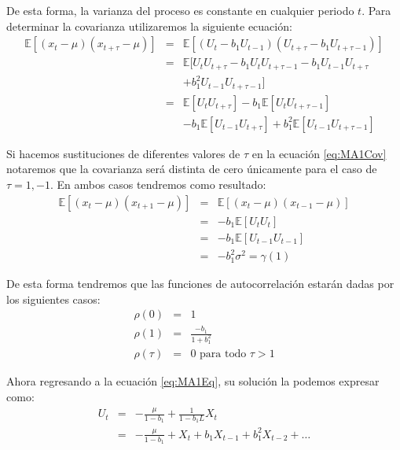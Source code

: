 \documentclass[
]{book}
\begin{document}
De esta forma, la varianza del proceso es constante en cualquier periodo \(t\). Para determinar la covarianza utilizaremos la siguiente ecuación:
\begin{eqnarray}
    \mathbb{E}[(x_t - \mu)(x_{t + \tau} - \mu)] & = & \mathbb{E}[(U_t - b_1 U_{t-1})(U_{t + \tau} - b_1 U_{t + \tau - 1})] \nonumber \\
    & = & \mathbb{E}[U_t U_{t + \tau} - b_1 U_t U_{t + \tau - 1} - b_1 U_{t - 1} U_{t + \tau} \nonumber \\
    &   & + b_1^2 U_{t - 1} U_{t + \tau - 1}] \nonumber \\
    & = & \mathbb{E}[U_t U_{t + \tau}] - b_1 \mathbb{E}[U_t U_{t + \tau - 1}] \nonumber \\
    &   & - b_1 \mathbb{E}[U_{t - 1} U_{t + \tau}] + b_1^2 \mathbb{E}[U_{t - 1} U_{t + \tau - 1}]
    \label{eq:MA1Cov}
\end{eqnarray}

Si hacemos sustituciones de diferentes valores de \(\tau\) en la ecuación \eqref{eq:MA1Cov} notaremos que la covarianza será distinta de cero únicamente para el caso de \(\tau = 1, -1\). En ambos casos tendremos como resultado:
\begin{eqnarray}
    \mathbb{E}[(x_t - \mu)(x_{t + 1} - \mu)] & = & \mathbb{E}[(x_t - \mu)(x_{t - 1} - \mu)] \nonumber \\
    & = & - b_1 \mathbb{E}[U_t U_{t}] \nonumber \\
    & = & - b_1 \mathbb{E}[U_{t - 1} U_{t - 1}] \nonumber \\ 
    & = & - b_1^2 \sigma^2 = \gamma(1)
\end{eqnarray}

De esta forma tendremos que las funciones de autocorrelación estarán dadas por los siguientes casos:
\begin{eqnarray}
    \rho(0) & = & 1 \nonumber \\
    \rho(1) & = & \frac{- b_1}{1 + b_1^2} \nonumber \\
    \rho(\tau) & = & 0 \text{ para todo } \tau > 1 \nonumber 
\end{eqnarray}

Ahora regresando a la ecuación \eqref{eq:MA1Eq}, su solución la podemos expresar como:
\begin{eqnarray}
    U_ t & = & - \frac{\mu}{1 - b_1} + \frac{1}{1 - b_1 L} X_t \nonumber \\
    & = & - \frac{\mu}{1 - b_1} + X_t + b_1 X_{t-1} + b_1^2 X_{t-2} + \ldots \nonumber
\end{eqnarray}
\end{document}
